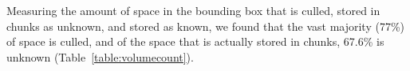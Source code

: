 \documentclass[conference]{IEEEtran}
\newcommand{\figref}[1]{Fig.\ref{#1}}
\newcommand{\tabref}[1]{Table~\ref{#1}}
\begin{document}
Measuring the amount of space in the bounding box that is culled, stored in
chunks as unknown, and stored as known, we found that the vast majority (77\%)
of space is culled, and of the space that is actually stored in chunks, 67.6\%
is unknown (\tabref{table:volumecount}).

\end{document}

